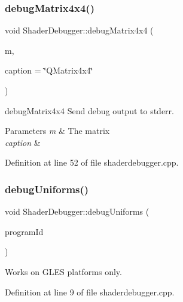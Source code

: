 \subsubsection{\texorpdfstring{debugMatrix4x4()}{debugMatrix4x4()}}
{\footnotesize\ttfamily void Shader\+Debugger\+::debug\+Matrix4x4 (\begin{DoxyParamCaption}\item[{const Q\+Matrix4x4 \&}]{m,  }\item[{const Q\+String \&}]{caption = {\ttfamily \char`\"{}QMatrix4x4\char`\"{}} }\end{DoxyParamCaption})\hspace{0.3cm}{\ttfamily [static]}}



debug\+Matrix4x4 Send debug output to stderr. 


\begin{DoxyParams}{Parameters}
{\em m} & The matrix \\
\hline
{\em caption} & \\
\hline
\end{DoxyParams}


Definition at line 52 of file shaderdebugger.\+cpp.

\mbox{\label{class_shader_debugger_abe24abd2ac69db02f63c2fb4fc829080}} 
\subsubsection{\texorpdfstring{debugUniforms()}{debugUniforms()}}
{\footnotesize\ttfamily void Shader\+Debugger\+::debug\+Uniforms (\begin{DoxyParamCaption}\item[{int}]{program\+Id }\end{DoxyParamCaption})\hspace{0.3cm}{\ttfamily [static]}}

Works on G\+L\+ES platforms only. 

Definition at line 9 of file shaderdebugger.\+cpp.

\mbox{\label{class_shader_debugger_afd6536a3c6c74c4b6af32ad128ba50d0}} 
